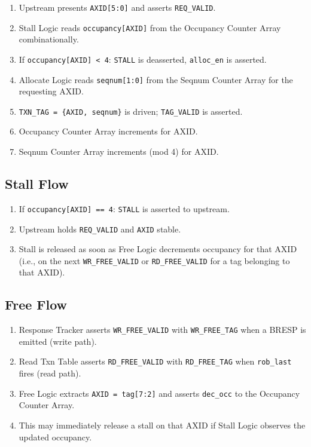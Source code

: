 \begin{enumerate}
  \item Upstream presents \texttt{AXID[5:0]} and asserts
        \texttt{REQ\_VALID}.
  \item Stall Logic reads \texttt{occupancy[AXID]} from the Occupancy
        Counter Array combinationally.
  \item If \texttt{occupancy[AXID] < 4}: \texttt{STALL} is deasserted,
        \texttt{alloc\_en} is asserted.
  \item Allocate Logic reads \texttt{seqnum[1:0]} from the Seqnum
        Counter Array for the requesting AXID.
  \item \texttt{TXN\_TAG = \{AXID, seqnum\}} is driven; \texttt{TAG\_VALID}
        is asserted.
  \item Occupancy Counter Array increments for AXID.
  \item Seqnum Counter Array increments (mod 4) for AXID.
\end{enumerate}

\subsection{Stall Flow}

\begin{enumerate}
  \item If \texttt{occupancy[AXID] == 4}: \texttt{STALL} is asserted
        to upstream.
  \item Upstream holds \texttt{REQ\_VALID} and \texttt{AXID} stable.
  \item Stall is released as soon as Free Logic decrements occupancy
        for that AXID (i.e., on the next \texttt{WR\_FREE\_VALID} or
        \texttt{RD\_FREE\_VALID} for a tag belonging to that AXID).
\end{enumerate}

\subsection{Free Flow}

\begin{enumerate}
  \item Response Tracker asserts \texttt{WR\_FREE\_VALID} with
        \texttt{WR\_FREE\_TAG} when a BRESP is emitted (write path).
  \item Read Txn Table asserts \texttt{RD\_FREE\_VALID} with
        \texttt{RD\_FREE\_TAG} when \texttt{rob\_last} fires (read path).
  \item Free Logic extracts \texttt{AXID = tag[7:2]} and asserts
        \texttt{dec\_occ} to the Occupancy Counter Array.
  \item This may immediately release a stall on that AXID if
        Stall Logic observes the updated occupancy.
\end{enumerate}

